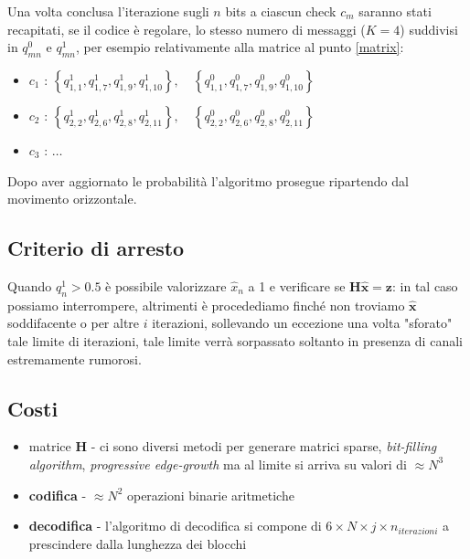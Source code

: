 	Una volta conclusa l'iterazione sugli $n$ bits a ciascun check $c_m$ saranno stati recapitati, se il codice è regolare, lo stesso numero di messaggi ($K=4$) suddivisi in $q^0_{mn}$ e $q^1_{mn}$, per esempio relativamente alla matrice al punto \ref{matrix}:

	\begin{itemize}
		\item $c_1$ : $\left\{ q^1_{1,1}, q^1_{1,7}, q^1_{1,9}, q^1_{1,10}\right\}, \quad \left\{ q^0_{1,1}, q^0_{1,7}, q^0_{1,9}, q^0_{1,10}\right\}$
		\item $c_2$ : $\left\{ q^1_{2,2}, q^1_{2,6}, q^1_{2,8}, q^1_{2,11}\right\}, \quad \left\{ q^0_{2,2}, q^0_{2,6}, q^0_{2,8}, q^0_{2,11}\right\}$
		\item $c_3$ : $\dots$
	\end{itemize}

	Dopo aver aggiornato le probabilità l'algoritmo prosegue ripartendo dal movimento orizzontale.
	
	\subsection{Criterio di arresto}

	Quando $q^1_n >0.5$ è possibile valorizzare $\hat{x}_n$ a 1  e verificare se $\textbf{H}\hat{\textbf{x}}=\textbf{z}$: in tal caso possiamo interrompere, altrimenti è procedediamo finché non troviamo $\hat{\textbf{x}}$ soddifacente o per altre $i$ iterazioni, sollevando un eccezione una volta "sforato" tale limite di iterazioni, tale limite verrà sorpassato soltanto in presenza di canali estremamente rumorosi.

	\subsection{Costi}

	\begin{itemize}
		\item matrice \textbf{H} -  ci sono diversi metodi per generare matrici sparse, \textit{bit-filling algorithm}, \textit{progressive edge-growth} ma al limite si arriva su valori di $\approx N^3$
		\item \textbf{codifica} - $\approx N^2$ operazioni binarie aritmetiche
		\item \textbf{decodifica} - l'algoritmo di decodifica si compone di $6 \times N \times j \times n_{iterazioni} $ a prescindere dalla lunghezza dei blocchi
	\end{itemize}